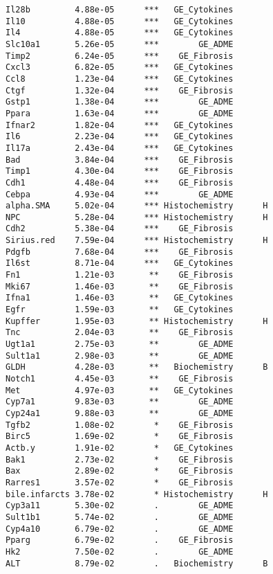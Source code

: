 \documentclass[]{article}
\begin{document}
\begin{verbatim}
Il28b         4.88e-05      ***   GE_Cytokines       
Il10          4.88e-05      ***   GE_Cytokines       
Il4           4.88e-05      ***   GE_Cytokines       
Slc10a1       5.26e-05      ***        GE_ADME       
Timp2         6.24e-05      ***    GE_Fibrosis       
Cxcl3         6.82e-05      ***   GE_Cytokines       
Ccl8          1.23e-04      ***   GE_Cytokines       
Ctgf          1.32e-04      ***    GE_Fibrosis       
Gstp1         1.38e-04      ***        GE_ADME       
Ppara         1.63e-04      ***        GE_ADME       
Ifnar2        1.82e-04      ***   GE_Cytokines       
Il6           2.23e-04      ***   GE_Cytokines       
Il17a         2.43e-04      ***   GE_Cytokines       
Bad           3.84e-04      ***    GE_Fibrosis       
Timp1         4.30e-04      ***    GE_Fibrosis       
Cdh1          4.48e-04      ***    GE_Fibrosis       
Cebpa         4.93e-04      ***        GE_ADME       
alpha.SMA     5.02e-04      *** Histochemistry      H
NPC           5.28e-04      *** Histochemistry      H
Cdh2          5.38e-04      ***    GE_Fibrosis       
Sirius.red    7.59e-04      *** Histochemistry      H
Pdgfb         7.68e-04      ***    GE_Fibrosis       
Il6st         8.71e-04      ***   GE_Cytokines       
Fn1           1.21e-03       **    GE_Fibrosis       
Mki67         1.46e-03       **    GE_Fibrosis       
Ifna1         1.46e-03       **   GE_Cytokines       
Egfr          1.59e-03       **   GE_Cytokines       
Kupffer       1.95e-03       ** Histochemistry      H
Tnc           2.04e-03       **    GE_Fibrosis       
Ugt1a1        2.75e-03       **        GE_ADME       
Sult1a1       2.98e-03       **        GE_ADME       
GLDH          4.28e-03       **   Biochemistry      B
Notch1        4.45e-03       **    GE_Fibrosis       
Met           4.97e-03       **   GE_Cytokines       
Cyp7a1        9.83e-03       **        GE_ADME       
Cyp24a1       9.88e-03       **        GE_ADME       
Tgfb2         1.08e-02        *    GE_Fibrosis       
Birc5         1.69e-02        *    GE_Fibrosis       
Actb.y        1.91e-02        *   GE_Cytokines       
Bak1          2.73e-02        *    GE_Fibrosis       
Bax           2.89e-02        *    GE_Fibrosis       
Rarres1       3.57e-02        *    GE_Fibrosis       
bile.infarcts 3.78e-02        * Histochemistry      H
Cyp3a11       5.30e-02        .        GE_ADME       
Sult1b1       5.74e-02        .        GE_ADME       
Cyp4a10       6.79e-02        .        GE_ADME       
Pparg         6.79e-02        .    GE_Fibrosis       
Hk2           7.50e-02        .        GE_ADME       
ALT           8.79e-02        .   Biochemistry      B

\end{verbatim}
\end{document}
